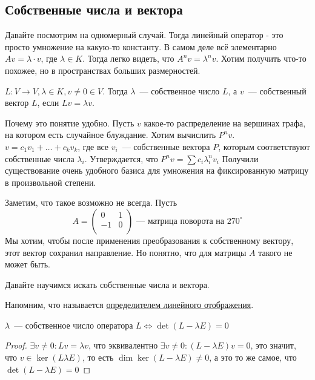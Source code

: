 \subsection{Собственные числа и вектора}
\begin{motivation}
    Давайте посмотрим на одномерный случай. Тогда линейный оператор - это просто умножение на какую-то константу.
    В самом деле всё элементарно $Av = \lambda\cdot v$, где $\lambda\in K$.
    Тогда легко видеть, что $A^nv = \lambda^n v$. Хотим получить что-то похожее, но в пространствах больших размерностей.
\end{motivation}
\begin{definition}
    $L\colon V\rightarrow V, \lambda\in K, v\not= 0\in V$. Тогда $\lambda$~--- собственное число $L$, а $v$~--- собственный вектор $L$,
    если $Lv = \lambda v$.
\end{definition}
\begin{motivation}
    Почему это понятие удобно. Пусть $v$ какое-то распределение на вершинах графа, на котором есть случайное блуждание.
    Хотим вычислить $P^n v$. $v = c_1v_1 + \dots + c_kv_k$, где все $v_i$~--- собственные вектора $P$,
    которым соответствуют собственные числа $\lambda_i$. Утверждается, что $P^n v = \sum c_i \lambda_i^n v_i$
    Получили существование очень удобного базиса для умножения на фиксированную матрицу в произвольной степени.
\end{motivation}
\begin{remark}
    Заметим, что такое возможно не всегда.
    Пусть 
    \[
    A = 
    \begin{pmatrix}
        0& 1\\
        -1&0\\
    \end{pmatrix}
    \text{~--- матрица поворота на~} 270^\circ 
    \]
    Мы хотим, чтобы после применения преобразования к собственному вектору, этот вектор сохранил направление.
    Но понятно, что для матрицы $A$ такого не может быть.
\end{remark}
\begin{motivation}
    Давайте научимся искать собственные числа и вектора.
\end{motivation}
\begin{remark}
    Напомним, что называется \hyperref[def:определитель отображения]{определителем линейного отображения}.
\end{remark}
\begin{statement}
    $\lambda$~--- собственное число оператора $L \Leftrightarrow \det(L - \lambda E) = 0$
\end{statement}
\begin{proof}
    $\exists v\not= 0\colon Lv = \lambda v$, что эквивалентно $\exists v\not=0\colon (L - \lambda E)v = 0$,
    это значит, что $v \in \ker (L \lambda E)$, то есть $\dim \ker (L - \lambda E) \neq 0$,
    а это то же самое, что $\det(L - \lambda E) = 0$
\end{proof}
